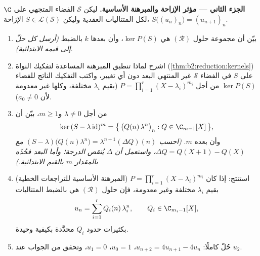 \begin{problem}
\medskip
\noindent\textbf{الجزء الثاني --- مؤثر الإزاحة والمبرهنة
الأساسية.} ليكن $\mathcal{S}$ الفضاء المتجهي على $\C$
لكل المتتاليات العقدية وليكن $S \in
\mathcal{L}(\mathcal{S})$ الإزاحة، $S\bigl((u_n)_n\bigr) =
(u_{n+1})_n$.
\begin{enumerate}[resume]
  \item بيّن أن مجموعة حلول $(\mathcal R)$ هي $\ker
        P(S)$، وأن بعدها $k$ بالضبط \emph{(أرسل كل
        حلّ إلى قيمه الابتدائية)}.
  \item اشرح لماذا تنطبق المبرهنة المساعدة لتفكيك النواة
        (\cref{thm:b2:reduction:kernels}) على $S$ في الفضاء
        $\mathcal{S}$ غير المنتهي البعد دون أي تغيير،
        واكتب التفكيك الناتج للفضاء $\ker P(S)$ من أجل
        $P = \prod_{i=1}^{r}(X - \lambda_i)^{m_i}$ (بقيم
        $\lambda_i$ مختلفة، وكلها غير معدومة لأن $a_0 \neq 0$).
  \item من أجل $\lambda \neq 0$ و$m \geq 1$، بيّن أن
        \[
        \ker\,(S - \lambda\,\mathrm{id})^m
        = \bigl\{\,\bigl(Q(n)\,\lambda^n\bigr)_n : Q \in
        \C_{m-1}[X]\,\bigr\},
        \]
        وأن بعده $m$. \emph{(احسب $(S -
        \lambda)\bigl(Q(n)\lambda^n\bigr) =
        \lambda^{n+1}(\Delta Q)(n)$ مع $\Delta Q = Q(X + 1) -
        Q(X)$، واستعمل أن $\Delta$ يُنقص الدرجة؛ وأما
        البعد فحُدّه بالمقدار $m$ بالقيم الابتدائية.)}
  \item (المبرهنة الأساسية للتراجعات الخطية) استنتج:
        إذا كان $P = \prod_{i=1}^{r}(X - \lambda_i)^{m_i}$ بقيم
        $\lambda_i$ مختلفة وغير معدومة، فإن حلول
        $(\mathcal R)$ هي بالضبط المتتاليات
        \[
        u_n = \sum_{i=1}^{r} Q_i(n)\,\lambda_i^n,
        \qquad Q_i \in \C_{m_i - 1}[X],
        \]
        بكثيرات حدود $Q_i$ محدَّدة بكيفية وحيدة.
  \item حُلّ كاملًا: $u_{n+2} = 4u_{n+1} - 4u_n$، $u_0 =
        1$، $u_1 = 0$، وتحقق من الجواب عند $u_2$.
\end{enumerate}


\end{problem}
